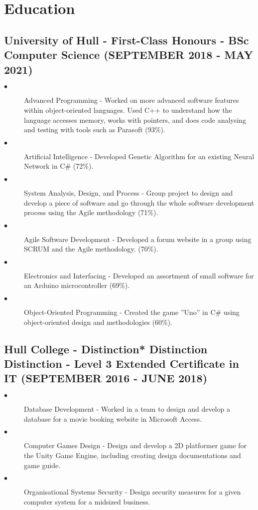 \documentclass{article}
\begin{document}
\section{Education}
\noindent
\hfill
\begin{minipage}[t]{1\textwidth}
    \subsection{University of Hull - First-Class Honours \textnormal{- BSc Computer Science} \footnotesize{(SEPTEMBER 2018 - MAY 2021)}}
    \normalsize{}
    \begin{description}
        \item[$\bullet$]Advanced Programming - Worked on more advanced software features within object-oriented languages. Used C++ to understand how the language accesses memory, works with pointers, and does code analysing and testing with tools such as Parasoft (93\%).
        \item[$\bullet$]Artificial Intelligence - Developed Genetic Algorithm for an existing Neural Network in C\# (72\%).
        \item[$\bullet$]System Analysis, Design, and Process - Group project to design and develop a piece of software and go through the whole software development process using the Agile methodology (71\%).
        \item[$\bullet$]Agile Software Development - Developed a forum website in a group using SCRUM and the Agile methodology. (70\%).
        \item[$\bullet$]Electronics and Interfacing - Developed an assortment of small software for an Arduino microcontroller (69\%).
        \item[$\bullet$]Object-Oriented Programming - Created the game ”Uno” in C\# using object-oriented design and methodologies (60\%).
    \end{description}
    \subsection{Hull College - Distinction* Distinction Distinction \textnormal{- Level 3 Extended Certificate in IT} \footnotesize{(SEPTEMBER 2016 - JUNE 2018)}}
    \normalsize{}
    \begin{description}
        \item[$\bullet$]Database Development - Worked in a team to design and develop a database for a movie booking website in Microsoft Access.
        \item[$\bullet$]Computer Games Design - Design and develop a 2D platformer game for the Unity Game Engine, including creating design documentations and game guide.
        \item[$\bullet$]Organisational Systems Security - Design security measures for a given computer system for a midsized business. 
    \end{description}

\end{minipage}
\end{document}
